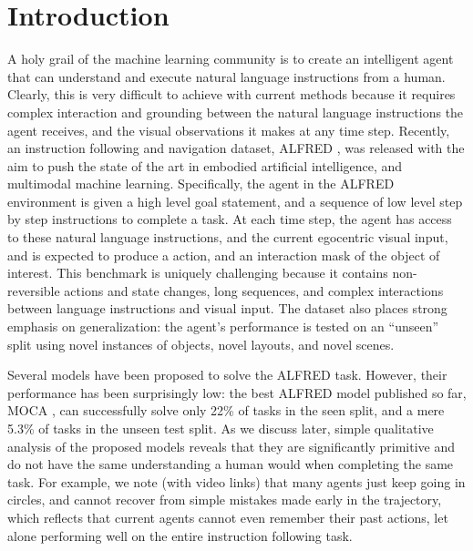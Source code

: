 \documentclass[11pt,a4paper]{article}
\begin{document}
\section{Introduction}
A holy grail of the machine learning community is to create an intelligent agent that can understand and execute natural language instructions from a human. Clearly, this is very difficult to achieve with current methods because it requires complex interaction and grounding between the natural language instructions the agent receives, and the visual observations it makes at any time step. Recently, an instruction following and navigation dataset, ALFRED \cite{shridhar2020alfred}, was released with the aim to push the state of the art in embodied artificial intelligence, and multimodal machine learning. Specifically, the agent in the ALFRED environment is given a high level goal statement, and a sequence of low level step by step instructions to complete a task. At each time step, the agent has access to these natural language instructions, and the current egocentric visual input, and is expected to produce a action, and an interaction mask of the object of interest. This benchmark is uniquely challenging because it contains non-reversible actions and state changes, long sequences, and complex interactions between language instructions and visual input. The dataset also places strong emphasis on generalization: the agent's performance is tested on an ``unseen'' split using novel instances of objects, novel layouts, and novel scenes.

Several models have been proposed \cite{shridhar2020alfred, corona2020modularity, singh2020moca, Storks2021AreWT} to solve the ALFRED task. However, their performance has been surprisingly low: the best ALFRED model published so far, MOCA \cite{singh2020moca}, can successfully solve only 22\% of tasks in the seen split, and a mere 5.3\% of tasks in the unseen test split. As we discuss later, simple qualitative analysis of the proposed models reveals that they are significantly primitive and do not have the same understanding a human would when completing the same task. For example, we note (with video links) that many agents just keep going in circles, and cannot recover from simple mistakes made early in the trajectory, which reflects that current agents cannot even remember their past actions, let alone performing well on the entire instruction following task.
\end{document}

